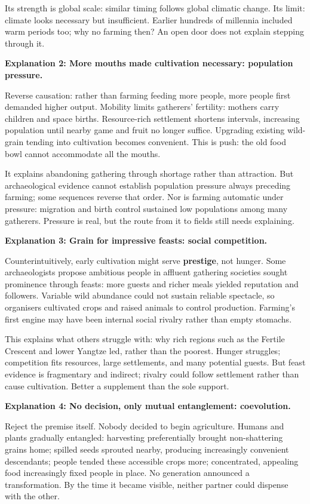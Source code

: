 Its strength is global scale: similar timing follows global climatic change. Its limit: climate looks necessary but insufficient. Earlier hundreds of millennia included warm periods too; why no farming then? An open door does not explain stepping through it.

\textbf{Explanation 2: More mouths made cultivation necessary: population pressure.}

Reverse causation: rather than farming feeding more people, more people first demanded higher output. Mobility limits gatherers' fertility: mothers carry children and space births. Resource-rich settlement shortens intervals, increasing population until nearby game and fruit no longer suffice. Upgrading existing wild-grain tending into cultivation becomes convenient. This is push: the old food bowl cannot accommodate all the mouths.

It explains abandoning gathering through shortage rather than attraction. But archaeological evidence cannot establish population pressure always preceding farming; some sequences reverse that order. Nor is farming automatic under pressure: migration and birth control sustained low populations among many gatherers. Pressure is real, but the route from it to fields still needs explaining.

\textbf{Explanation 3: Grain for impressive feasts: social competition.}

Counterintuitively, early cultivation might serve \textbf{prestige}, not hunger. Some archaeologists propose ambitious people in affluent gathering societies sought prominence through feasts: more guests and richer meals yielded reputation and followers. Variable wild abundance could not sustain reliable spectacle, so organisers cultivated crops and raised animals to control production. Farming's first engine may have been internal social rivalry rather than empty stomachs.

This explains what others struggle with: why rich regions such as the Fertile Crescent and lower Yangtze led, rather than the poorest. Hunger struggles; competition fits resources, large settlements, and many potential guests. But feast evidence is fragmentary and indirect; rivalry could follow settlement rather than cause cultivation. Better a supplement than the sole support.

\textbf{Explanation 4: No decision, only mutual entanglement: coevolution.}

Reject the premise itself. Nobody decided to begin agriculture. Humans and plants gradually entangled: harvesting preferentially brought non-shattering grains home; spilled seeds sprouted nearby, producing increasingly convenient descendants; people tended these accessible crops more; concentrated, appealing food increasingly fixed people in place. No generation announced a transformation. By the time it became visible, neither partner could dispense with the other.

